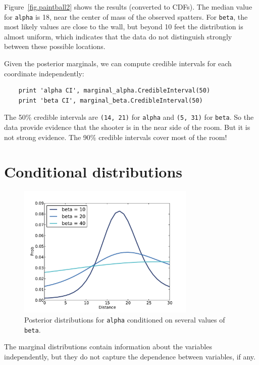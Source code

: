 \documentclass[12pt]{book}
\begin{document}
Figure~\ref{fig.paintball2} shows the results (converted to CDFs).
The median value for {\tt alpha} is 18, near the center of mass of
the observed spatters.  For {\tt beta}, the most likely values are
close to the wall, but beyond 10 feet the distribution is almost
uniform, which indicates that the data do not distinguish strongly
between these possible locations.

Given the posterior marginals, we can compute credible intervals
for each coordinate independently:

\begin{verbatim}
    print 'alpha CI', marginal_alpha.CredibleInterval(50)
    print 'beta CI', marginal_beta.CredibleInterval(50)
\end{verbatim}

The 50\% credible intervals are {\tt (14, 21)} for {\tt alpha} and
{\tt (5, 31)} for {\tt beta}.  So the data provide evidence that the
shooter is in the near side of the room.  But it is not strong
evidence.  The 90\% credible intervals cover most of the room!


\section{Conditional distributions}
\label{conditional}

\begin{figure}
\centerline{\includegraphics[height=2.5in]{figs/paintball3.pdf}}
\caption{Posterior distributions for {\tt alpha} conditioned on several values
of {\tt beta}.}
\label{fig.paintball3}
\end{figure}

The marginal distributions contain information about the variables
independently, but they do not capture the dependence between
variables, if any.
\end{document}
